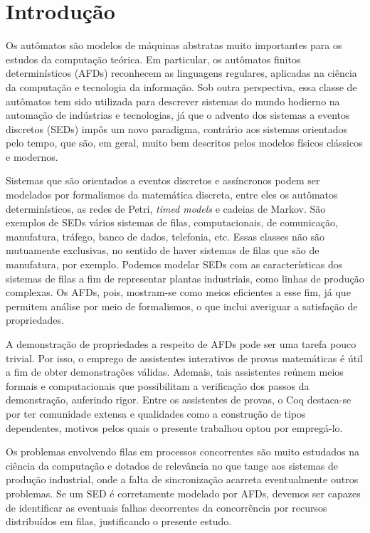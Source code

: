 \chapter{Introdução}

Os autômatos são modelos de máquinas abstratas muito importantes para os estudos da computação teórica. Em particular, os autômatos finitos determinísticos (\acs{AFD}s) reconhecem as linguagens regulares, aplicadas na ciência da computação e tecnologia da informação. Sob outra perspectiva, essa classe de autômatos tem sido utilizada para descrever sistemas do mundo hodierno na automação de indústrias e tecnologias, já que o advento dos sistemas a eventos discretos (\acs{SED}s) impôs um novo paradigma, contrário aos sistemas orientados pelo tempo, que são, em geral, muito bem descritos pelos modelos físicos clássicos e modernos.

Sistemas que são orientados a eventos discretos e assíncronos podem ser modelados por formalismos da matemática discreta, entre eles os autômatos determinísticos, as redes de Petri, \textit{timed models} e cadeias de Markov. São exemplos de SEDs vários sistemas de filas, computacionais, de comunicação, manufatura, tráfego, banco de dados, telefonia, etc. Essas classes não são mutuamente exclusivas, no sentido de haver sistemas de filas que são de manufatura, por exemplo. Podemos modelar SEDs com as características dos sistemas de filas a fim de representar plantas industriais, como linhas de produção complexas. Os AFDs, pois, mostram-se como meios eficientes a esse fim, já que permitem análise por meio de formalismos, o que inclui averiguar a satisfação de propriedades.

A demonstração de propriedades a respeito de AFDs pode ser uma tarefa pouco trivial. Por isso, o emprego de assistentes interativos de provas matemáticas é útil a fim de obter demonstrações válidas. Ademais, tais assistentes reúnem meios formais e computacionais que possibilitam a verificação dos passos da demonstração, auferindo rigor. Entre os assistentes de provas, o Coq destaca-se por ter comunidade extensa e qualidades como a construção de tipos dependentes, motivos pelos quais o presente trabalhou optou por empregá-lo.

Os problemas envolvendo filas em processos concorrentes são muito estudados na ciência da computação e dotados de relevância no que tange aos sistemas de produção industrial, onde a falta de sincronização acarreta eventualmente outros problemas. Se um SED é corretamente modelado por AFDs, devemos ser capazes de identificar as eventuais falhas decorrentes da concorrência por recursos distribuídos em filas, justificando o presente estudo.


